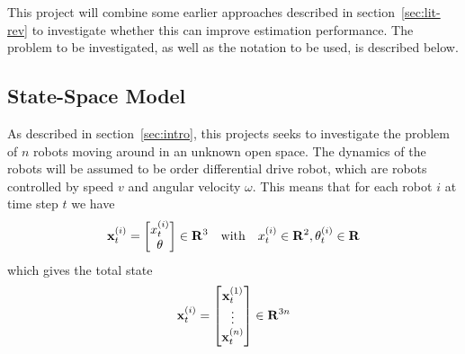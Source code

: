 This project will combine some earlier approaches described in section~\ref{sec:lit-rev} to investigate whether this can improve estimation performance. The problem to be investigated, as well as the notation to be used, is described below.

\subsection{State-Space Model}
As described in section~\ref{sec:intro}, this projects seeks to investigate the problem of $n$ robots moving around in an unknown open space. The dynamics of the robots will be assumed to be  order differential drive robot, which are robots controlled by speed $v$ and angular velocity $\omega$. This means that for each robot $i$ at time step $t$ we have 
\begin{align}
    \state = \begin{bmatrix}
        \x \\ \theta
    \end{bmatrix}
    \in \R{3} \quad \text{with} \quad \x \in \R{2}, \thet \in \R{}
\end{align}
which gives the total state
\begin{align}
    \state = \begin{bmatrix}
        \state[1] \\ \vdots \\ \state[n] 
    \end{bmatrix}
    \in \R{3n}
\end{align}

